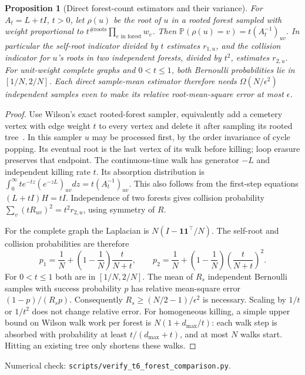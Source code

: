 \documentclass[11pt]{article}
\newtheorem{proposition}[theorem]{Proposition}
\newcommand{\Prob}{\mathbb P}
\newcommand{\ind}{\mathbf 1}
\begin{document}
\begin{proposition}[Direct forest-count estimators and their variance]\label{prop:forest}
For $A_t=L+tI$, $t>0$, let $\rho(u)$ be the root of $u$ in a
rooted forest sampled with weight proportional to
$t^{\#\text{roots}}\prod_{e\text{ in forest}}w_e$.
Then $\Prob(\rho(u)=v)=t(A_t^{-1})_{uv}$.
In particular the self-root indicator divided by $t$ estimates
$r_{1,u}$, and the collision indicator for $u$'s roots in two
independent forests, divided by $t^2$, estimates $r_{2,u}$.
For unit-weight complete graphs and $0<t\leq1$, both Bernoulli
probabilities lie in $[1/N,2/N]$. Each direct sample-mean estimator
therefore needs $\Omega(N/\epsilon^2)$ independent samples even
to make its relative root-mean-square error at most $\epsilon$.
\end{proposition}
\begin{proof}
Use Wilson's exact rooted-forest sampler, equivalently add a cemetery
vertex with edge weight $t$ to every vertex and delete it after
sampling its rooted tree~\cite{wilson1996}. In this sampler $u$
may be processed first, by the order invariance of cycle popping.
Its eventual root is the last vertex of its walk before killing;
loop erasure preserves that endpoint. The continuous-time walk
has generator $-L$ and independent killing rate $t$.
Its absorption distribution is
$\int_0^\infty t e^{-tz}(e^{-zL})_{uv}dz=t(A_t^{-1})_{uv}$.
This also follows from the first-step equations
$(L+tI)H=tI$. Independence of two forests gives collision probability
$\sum_v(tR_{uv})^2=t^2r_{2,u}$, using symmetry of $R$.

For the complete graph the Laplacian is $N(I-\ind\ind^\top/N)$.
The self-root and collision probabilities are therefore
\[
 p_1=\frac1N+\left(1-\frac1N\right)\frac{t}{N+t},\qquad
 p_2=\frac1N+\left(1-\frac1N\right)\left(\frac{t}{N+t}\right)^2.
\]
For $0<t\leq1$ both are in $[1/N,2/N]$.
The mean of $R_s$ independent Bernoulli samples with success
probability $p$ has relative mean-square error $(1-p)/(R_sp)$.
Consequently $R_s\geq(N/2-1)/\epsilon^2$ is necessary.
Scaling by $1/t$ or $1/t^2$ does not change relative error.
For homogeneous killing, a simple upper bound on Wilson walk work
per forest is $N(1+d_{\max}/t)$: each walk step is absorbed with
probability at least $t/(d_{\max}+t)$, and at most $N$ walks start.
Hitting an existing tree only shortens these walks.
\end{proof}
\noindent Numerical check: \texttt{scripts/verify\_t6\_forest\_comparison.py}.
\end{document}
